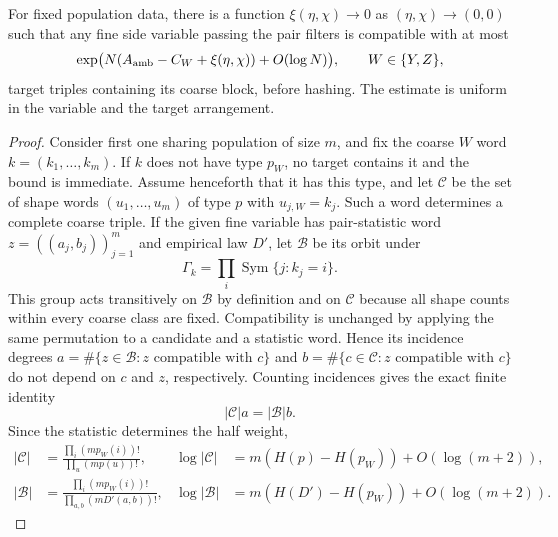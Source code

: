 \begin{lemma}\label{lem:compatibility-count}
For fixed population data, there is a function
$\xi(\eta,\chi)\to0$ as $(\eta,\chi)\to(0,0)$ such that any
fine side variable passing the pair filters is compatible with at most
\begin{equation}\label{eq:compatibility-degree}
 \exp\bigl(N(A_{\rm amb}-C_W+\xi(\eta,\chi))
                    +O(\log N)\bigr),\qquad W\in\{Y,Z\},
\end{equation}
target triples containing its coarse block, before hashing.
The estimate is uniform in the variable and the target arrangement.
\end{lemma}

\begin{proof}
Consider first one sharing population of size $m$, and fix the
coarse $W$ word $k=(k_1,\ldots,k_m)$.  If $k$ does not have type
$p_W$, no target contains it and the bound is immediate.  Assume
henceforth that it has this type, and let $\mathcal C$ be the
set of shape words $(u_1,\ldots,u_m)$ of type $p$ with $u_{j,W}=k_j$.
Such a word determines a complete coarse triple.  If the given fine
variable has pair-statistic word $z=((a_j,b_j))_{j=1}^m$ and empirical
law $D'$, let $\mathcal B$ be its orbit under
\[
 \Gamma_k=\prod_i\operatorname{Sym}\{j:k_j=i\}.
\]
This group acts transitively on $\mathcal B$ by definition and on
$\mathcal C$ because all shape counts within every coarse class are
fixed.  Compatibility is unchanged by applying the same permutation
to a candidate and a statistic word.  Hence its incidence degrees
$a=\#\{z\in\mathcal B:z\text{ compatible with }c\}$ and
$b=\#\{c\in\mathcal C:z\text{ compatible with }c\}$ do not depend
on $c$ and $z$, respectively.  Counting incidences gives the exact
finite identity
\begin{equation}\label{eq:incidence-identity}
 |\mathcal C|a=|\mathcal B|b.
\end{equation}
Since the statistic determines the half weight,
\begin{align*}
 |\mathcal C|&=\frac{\prod_i(mp_W(i))!}{\prod_u(mp(u))!},
 &\log|\mathcal C|&=m(H(p)-H(p_W))+O(\log(m+2)),\\
 |\mathcal B|&=\frac{\prod_i(mp_W(i))!}{\prod_{a,b}(mD'(a,b))!},
 &\log|\mathcal B|&=m(H(D')-H(p_W))+O(\log(m+2)).
\end{align*}


\end{proof}
